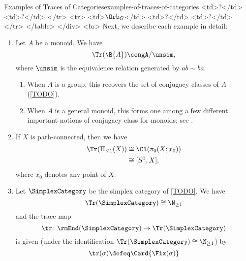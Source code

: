 \begin{example}{Examples of Traces of Categories}{examples-of-traces-of-categories}
          <td>?</td>
          <td>?</td>
        </tr>
        <tr>
          <td>$\Orb_{G}$</td>
          <td>?</td>
          <td>?</td>
        </tr>
      </table>
    </div>
    <br>
    Next, we describe each example in detail:
    \begin{enumerate}
        \item\label{examples-of-traces-of-categories-the-trace-of-a-monoid}Let $A$ be a monoid. We have
            \[
                \Tr(\B{A})%
                \cong%
                A/\unsim,%
            \]%
            where $\unsim$ is the equivalence relation generated by $ab\sim ba$.
            \begin{enumerate}
                \item When $A$ is a group, this recovers the set of conjugacy classes of $A$ (\cref{TODO}).
                \item When $A$ is a general monoid, this forms one among a few different important notions of conjugacy class for monoids; see \cite{four-notions-of-conjugacy-for-abstract-semigroups}.
            \end{enumerate}
        \item\label{examples-of-traces-of-categories-the-trace-of-the-fundamental-groupoid-of-a-topological-space}If $X$ is path-connected, then we have
            \begin{align*}
                \Tr(\Pi_{\leq1}(X)) &\cong \Cl(\pi_{0}(X;x_{0}))\\%
                                    &\cong [S^{1},X],%
            \end{align*}
            where $x_{0}$ denotes any point of $X$.
        \item\label{examples-of-traces-of-categories-the-trace-of-the-simplex-category}Let $\SimplexCategory$ be the simplex category of \cref{TODO}. We have
            \[
                \Tr(\SimplexCategory)%
                \cong%
                \N_{\geq1}%
            \]%
            and the trace map
            \[
                \tr%
                \colon%
                \rmEnd(\SimplexCategory)%
                \to%
                \Tr(\SimplexCategory)%
            \]%
            is given (under the identification $\Tr(\SimplexCategory)\cong\N_{\geq1}$) by
            \[
                \tr(\sigma)%
                \defeq%
                \Card{\Fix(\sigma)}%
\]
\end{enumerate}
\end{example}
